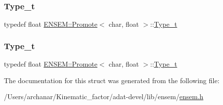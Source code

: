 \mbox{\label{structENSEM_1_1Promote_3_01char_00_01float_01_4_ab888f85116b883e8bcc31eb0c1a7a6da}} 
\subsubsection{\texorpdfstring{Type\_t}{Type\_t}\hspace{0.1cm}{\footnotesize\ttfamily [2/3]}}
{\footnotesize\ttfamily typedef float \mbox{\hyperlink{structENSEM_1_1Promote}{E\+N\+S\+E\+M\+::\+Promote}}$<$ char, float $>$\+::\mbox{\hyperlink{structENSEM_1_1Promote_3_01char_00_01float_01_4_ab888f85116b883e8bcc31eb0c1a7a6da}{Type\+\_\+t}}}

\mbox{\label{structENSEM_1_1Promote_3_01char_00_01float_01_4_ab888f85116b883e8bcc31eb0c1a7a6da}} 
\subsubsection{\texorpdfstring{Type\_t}{Type\_t}\hspace{0.1cm}{\footnotesize\ttfamily [3/3]}}
{\footnotesize\ttfamily typedef float \mbox{\hyperlink{structENSEM_1_1Promote}{E\+N\+S\+E\+M\+::\+Promote}}$<$ char, float $>$\+::\mbox{\hyperlink{structENSEM_1_1Promote_3_01char_00_01float_01_4_ab888f85116b883e8bcc31eb0c1a7a6da}{Type\+\_\+t}}}



The documentation for this struct was generated from the following file\+:\begin{DoxyCompactItemize}
\item 
/\+Users/archanar/\+Kinematic\+\_\+factor/adat-\/devel/lib/ensem/\mbox{\hyperlink{adat-devel_2lib_2ensem_2ensem_8h}{ensem.\+h}}\end{DoxyCompactItemize}

